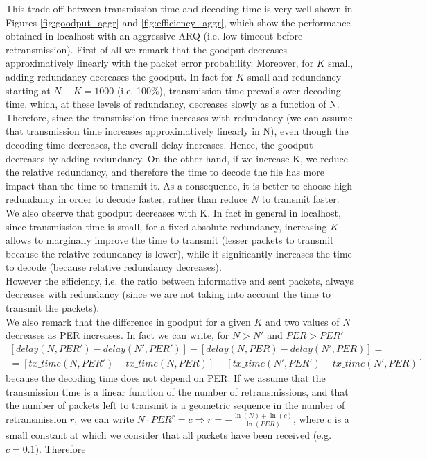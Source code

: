 This trade-off between transmission time and decoding time is very well shown in Figures \ref{fig:goodput_aggr} and \ref{fig:efficiency_aggr}, which show the performance obtained in localhost with an aggressive ARQ (i.e. low timeout before retransmission). First of all we remark that the goodput decreases approximatively linearly with the packet error probability. Moreover, for $K$ small, adding redundancy decreases the goodput. In fact for $K$ small and redundancy starting at $N-K=1000$ (i.e. 100\%), transmission time prevails over decoding time, which, at these levels of redundancy, decreases slowly as a function of N. Therefore, since the transmission time increases with redundancy (we can assume that transmission time increases approximatively linearly in N), even though the decoding time decreases, the overall delay increases. Hence, the goodput decreases by adding redundancy.
On the other hand, if we increase K, we reduce the relative redundancy, and therefore the time to decode the file has more impact than the time to transmit it. As a consequence, it is better to choose high redundancy in order to decode faster, rather than reduce $N$ to transmit faster.\\
We also observe that goodput decreases with K. In fact in general in localhost, since transmission time is small, for a fixed absolute redundancy, increasing $K$ allows to marginally improve the time to transmit (lesser packets to transmit because the relative redundancy is lower), while it significantly increases the time to decode (because relative redundancy decreases). \\
However the efficiency, i.e. the ratio between informative and sent packets, always decreases with redundancy (since we are not taking into account the time to transmit the packets).\\
We also remark that the difference in goodput for a given $K$ and two values of $N$ decreases as PER increases. In fact we can write, for $N>N'$ and $PER>PER'$
\begin{equation}
\begin{split}
[delay(N,PER')-delay(N',PER')]-[delay(N,PER)-delay(N',PER)]=\\
=[tx\_time(N,PER')-tx\_time(N,PER)]-[tx\_time(N',PER')-tx\_time(N',PER)]
\end{split}
\end{equation}
because the decoding time does not depend on PER. If we assume that the transmission time is a linear function of the number of retransmissions, and that the number of packets left to transmit is a geometric sequence in the number of retransmission $r$, we can write $N\cdot PER^r=c \Rightarrow r=-\frac{\ln(N)+\ln(c)}{\ln(PER)}$, where $c$ is a small constant at which we consider that all packets have been received (e.g. $c=0.1$). Therefore
